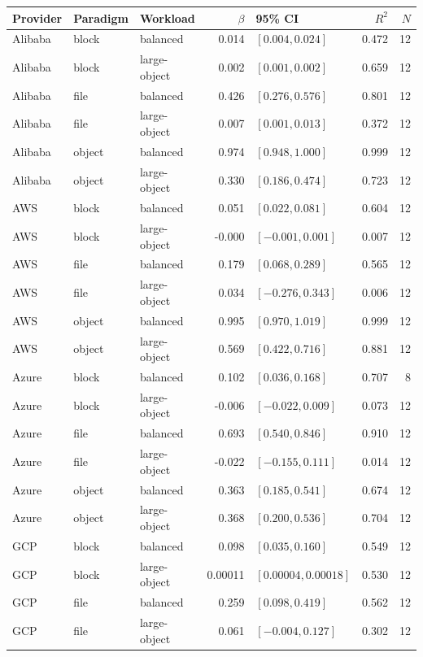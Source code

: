 \begin{tabular}{lllrlrr}
\toprule
Provider & Paradigm & Workload & $\beta$ & 95\% CI & $R^2$ & $N$ \\
\midrule
Alibaba & block & balanced & 0.014 & $[0.004, 0.024]$ & 0.472 & 12 \\
Alibaba & block & large-object & 0.002 & $[0.001, 0.002]$ & 0.659 & 12 \\
Alibaba & file & balanced & 0.426 & $[0.276, 0.576]$ & 0.801 & 12 \\
Alibaba & file & large-object & 0.007 & $[0.001, 0.013]$ & 0.372 & 12 \\
Alibaba & object & balanced & 0.974 & $[0.948, 1.000]$ & 0.999 & 12 \\
Alibaba & object & large-object & 0.330 & $[0.186, 0.474]$ & 0.723 & 12 \\
AWS & block & balanced & 0.051 & $[0.022, 0.081]$ & 0.604 & 12 \\
AWS & block & large-object & -0.000 & $[-0.001, 0.001]$ & 0.007 & 12 \\
AWS & file & balanced & 0.179 & $[0.068, 0.289]$ & 0.565 & 12 \\
AWS & file & large-object & 0.034 & $[-0.276, 0.343]$ & 0.006 & 12 \\
AWS & object & balanced & 0.995 & $[0.970, 1.019]$ & 0.999 & 12 \\
AWS & object & large-object & 0.569 & $[0.422, 0.716]$ & 0.881 & 12 \\
Azure & block & balanced & 0.102 & $[0.036, 0.168]$ & 0.707 & 8 \\
Azure & block & large-object & -0.006 & $[-0.022, 0.009]$ & 0.073 & 12 \\
Azure & file & balanced & 0.693 & $[0.540, 0.846]$ & 0.910 & 12 \\
Azure & file & large-object & -0.022 & $[-0.155, 0.111]$ & 0.014 & 12 \\
Azure & object & balanced & 0.363 & $[0.185, 0.541]$ & 0.674 & 12 \\
Azure & object & large-object & 0.368 & $[0.200, 0.536]$ & 0.704 & 12 \\
GCP & block & balanced & 0.098 & $[0.035, 0.160]$ & 0.549 & 12 \\
GCP & block & large-object & 0.00011 & $[0.00004, 0.00018]$ & 0.530 & 12 \\
GCP & file & balanced & 0.259 & $[0.098, 0.419]$ & 0.562 & 12 \\
GCP & file & large-object & 0.061 & $[-0.004, 0.127]$ & 0.302 & 12 \\

\end{tabular}
